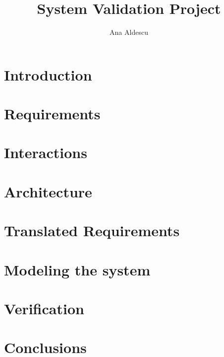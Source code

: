 \documentclass[a4paper,11pt]{report}
\title{System Validation Project}
\author{Ana Aldescu}
\begin{document}
	\newenvironment{frontmatter}{\pagenumbering{roman}}{\newpage {}}
	\begin{frontmatter}
		
		\newpage
		
		\tableofcontents
	\end{frontmatter}
	
	\chapter{Introduction}
	\label{chap:intro}
	
	\newpage
	
	\chapter{Requirements}
	\label{chap:reqs}
	
	\newpage
	
	\chapter{Interactions}
	\label{chap:interact}
	
	\newpage
		 
	\chapter{Architecture}
	\label{chap:arch}
			 
	\newpage
	
	
	\chapter{Translated Requirements}
	\label{chap:transReq}
	
	\newpage
	   	
	\chapter{Modeling the system}
	\label{chap:model}
	
	\newpage
	
	\chapter{Verification}
	\label{chap:verif}
	
	\newpage
	
	\chapter{Conclusions}
	\label{chap:concl}
	
	\newpage
	

%
%
\end{document}
